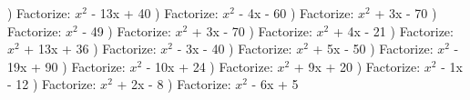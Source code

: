 \documentclass{article}%
\begin{document}
) Factorize: $x^2$ - 13x + 40%
\newline%
\newline%
) Factorize: $x^2$ - 4x - 60%
\newline%
\newline%
) Factorize: $x^2$ + 3x - 70%
\newline%
\newline%
) Factorize: $x^2$ - 49%
\newline%
\newline%
) Factorize: $x^2$ + 3x - 70%
\newline%
\newline%
) Factorize: $x^2$ + 4x - 21%
\newline%
\newline%
) Factorize: $x^2$ + 13x + 36%
\newline%
\newline%
) Factorize: $x^2$ - 3x - 40%
\newline%
\newline%
) Factorize: $x^2$ + 5x - 50%
\newline%
\newline%
) Factorize: $x^2$ - 19x + 90%
\newline%
\newline%
) Factorize: $x^2$ - 10x + 24%
\newline%
\newline%
) Factorize: $x^2$ + 9x + 20%
\newline%
\newline%
) Factorize: $x^2$ - 1x - 12%
\newline%
\newline%
) Factorize: $x^2$ + 2x - 8%
\newline%
\newline%
) Factorize: $x^2$ - 6x + 5%
\end{document}
